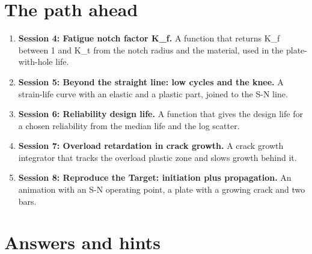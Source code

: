 \documentclass[11pt,a4paper]{article}
\begin{document}
\section{The path ahead}
\begin{enumerate}[nosep]
\item \textbf{Session 4: Fatigue notch factor K\_f.} A function that returns K\_f between 1 and K\_t from the notch radius and the material, used in the plate-with-hole life.
\item \textbf{Session 5: Beyond the straight line: low cycles and the knee.} A strain-life curve with an elastic and a plastic part, joined to the S-N line.
\item \textbf{Session 6: Reliability design life.} A function that gives the design life for a chosen reliability from the median life and the log scatter.
\item \textbf{Session 7: Overload retardation in crack growth.} A crack growth integrator that tracks the overload plastic zone and slows growth behind it.
\item \textbf{Session 8: Reproduce the Target: initiation plus propagation.} An animation with an S-N operating point, a plate with a growing crack and two bars.
\end{enumerate}

\section{Answers and hints}
\end{document}
